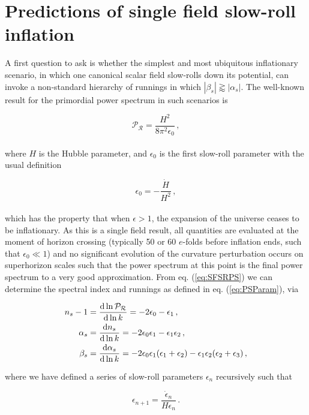 \documentclass[universe,preprints,oneauthor,pdftex,10pt,a4paper]{mdpi}
\newcommand{\beq}{\begin{equation}}
\newcommand{\eeq}{\end{equation}\\}
\newcommand{\bd}{{\rm d}}
\begin{document}
\section{Predictions of single field slow-roll inflation}

A first question to ask is whether the simplest and most ubiquitous inflationary scenario, in which one canonical scalar field slow-rolls down its potential, can invoke a non-standard hierarchy of runnings in which $|\beta_s| \gtrapprox |\alpha_s|$. The well-known result for the primordial power spectrum in such scenarios is

\beq
\mathcal{P}_\mathcal{R} = \frac{H^2}{8 \pi^2 \epsilon_0} \, , \label{eq:SFSRPS}
\eeq

where $H$ is the Hubble parameter, and $\epsilon_0$ is the first slow-roll parameter with the usual definition

\beq
\epsilon_0 = -\frac{\dot{H}}{H^2} \, ,
\eeq

which has the property that when $\epsilon > 1$, the expansion of the universe ceases to be inflationary. As this is a single field result, all quantities are evaluated at the moment of horizon crossing (typically 50 or 60 $e$-folds before inflation ends, such that $\epsilon_0 \ll 1$) and no significant evolution of the curvature perturbation occurs on superhorizon scales such that the power spectrum at this point is the final power spectrum to a very good approximation. From eq. (\ref{eq:SFSRPS}) we can determine the spectral index and runnings as defined in eq. (\ref{eq:PSParam}), via

\begin{align}
n_s - 1 & = \frac{\bd \ln \mathcal{P}_\mathcal{R}}{ \bd \ln k} = - 2 \epsilon_0 - \epsilon_1 \, , \label{eq:srns} \\
\alpha_s & = \frac{\bd n_s}{ \bd \ln k} = - 2 \epsilon_0 \epsilon_1 - \epsilon_1 \epsilon_2 \, , \\
\beta_s & = \frac{\bd \alpha_s}{ \bd \ln k} = - 2 \epsilon_0 \epsilon_1 (\epsilon_1 + \epsilon_2) - \epsilon_1 \epsilon_2 (\epsilon_2 + \epsilon_3) \, , \label{eq:srbetas}
\end{align}

where we have defined a series of slow-roll parameters $\epsilon_n$ recursively such that

\beq
\epsilon_{n+1} = \frac{\dot{\epsilon}_n}{H \epsilon_n} \, .
\eeq
\end{document}
